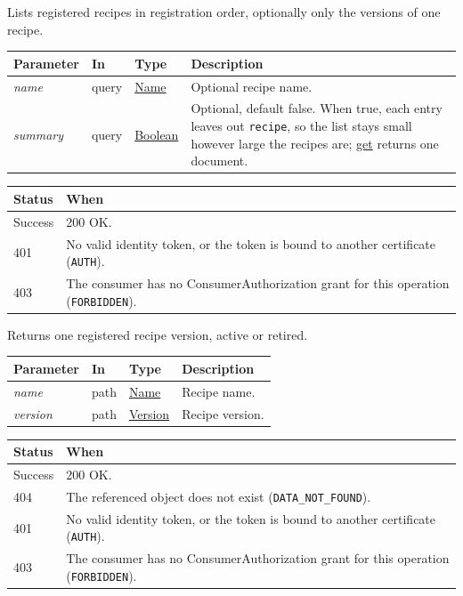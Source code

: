 \documentclass[a4paper]{arrowhead}
\newcommand{\fparam}[1]{\textit{\textcolor{ArrowheadBlue}{#1}}}
\newcommand{\oref}[1]{{\textcolor{ArrowheadBlue}{\hyperref[sec:operations:#1]{#1}}}}
\newcommand{\pref}[1]{{\textcolor{ArrowheadGrey}{\hyperref[sec:model:primitives:#1]{#1}}}}
\begin{document}
Lists registered recipes in registration order, optionally only the versions of one recipe.

{\small
\begin{longtable}{|p{3.0cm}|p{1.4cm}|p{3.2cm}|p{8.2cm}|}

\hline
\rowcolor{gray!33} Parameter & In & Type & Description \\ \hline
\endhead
\fparam{name} & query & \pref{Name} & Optional recipe name. \\ \hline
\fparam{summary} & query & \pref{Boolean} & Optional, default false. When true, each entry leaves out \texttt{recipe}, so the list stays small however large the recipes are; \oref{get} returns one document. \\ \hline
\end{longtable}
}


{\small
\begin{longtable}{|p{2.0cm}|p{13.8cm}|}

\hline
\rowcolor{gray!33} Status & When \\ \hline
\endhead
Success & 200 OK. \\ \hline
401 & No valid identity token, or the token is bound to another certificate (\texttt{AUTH}). \\ \hline
403 & The consumer has no ConsumerAuthorization grant for this operation (\texttt{FORBIDDEN}). \\ \hline
\end{longtable}
}

Returns one registered recipe version, active or retired.

{\small
\begin{longtable}{|p{3.0cm}|p{1.4cm}|p{3.2cm}|p{8.2cm}|}

\hline
\rowcolor{gray!33} Parameter & In & Type & Description \\ \hline
\endhead
\fparam{name} & path & \pref{Name} & Recipe name. \\ \hline
\fparam{version} & path & \pref{Version} & Recipe version. \\ \hline
\end{longtable}
}


{\small
\begin{longtable}{|p{2.0cm}|p{13.8cm}|}

\hline
\rowcolor{gray!33} Status & When \\ \hline
\endhead
Success & 200 OK. \\ \hline
404 & The referenced object does not exist (\texttt{DATA\_\allowbreak{}NOT\_\allowbreak{}FOUND}). \\ \hline
401 & No valid identity token, or the token is bound to another certificate (\texttt{AUTH}). \\ \hline
403 & The consumer has no ConsumerAuthorization grant for this operation (\texttt{FORBIDDEN}). \\ \hline
\end{longtable}
}
\end{document}
